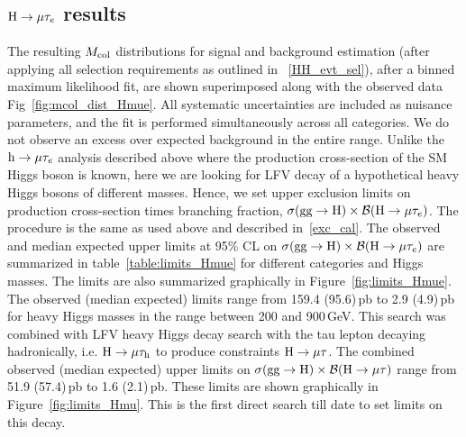 \subsection{$\text{H} \to \mu \tau_{e}$ results}
The resulting $M_{\text{col}}$ distributions for signal and background estimation (after applying all selection requirements as outlined in ~\ref{HH_evt_sel}), after a binned maximum likelihood fit, are shown superimposed along with the observed data Fig~\ref{fig:mcol_dist_Hmue}. All systematic uncertainties are included as nuisance parameters, and the fit is performed simultaneously across all categories. We do not observe an excess over expected background in the entire range. Unlike the $\text{h} \to \mu \tau_{e}$ analysis described above where the production cross-section of the SM Higgs boson is known, here we are looking for LFV decay of a hypothetical heavy Higgs bosons of different masses. Hence, we set upper exclusion limits on production cross-section times branching fraction, $\sigma(\textrm{gg}\rightarrow \text{H})\times\mathcal{B}(\text{H} \to \mu \tau_{e})$. The procedure is the same as used above and described in~\ref{exc_cal}. The observed and median expected upper limits at 95\% CL on $\sigma(\textrm{gg}\rightarrow \text{H})\times\mathcal{B}(\text{H} \to \mu \tau_{e})$ are summarized in table~\ref{table:limits_Hmue} for different categories and Higgs masses. The limits are also summarized graphically in Figure~\ref{fig:limits_Hmue}. The observed (median expected) limits range from 159.4 (95.6)\,pb to 2.9 (4.9)\,pb for heavy Higgs masses in the range between 200 and 900\,GeV. This search was combined with LFV heavy Higgs decay search with the tau lepton decaying hadronically, i.e. $\text{H} \to \mu \tau_{\text{h}}$ to produce constraints $\text{H} \to \mu \tau$. The combined observed (median expected) upper limits on $\sigma(\textrm{gg}\rightarrow \text{H})\times\mathcal{B}(\text{H} \to \mu \tau)$ range from 51.9 (57.4)\,pb to 1.6 (2.1)\,pb. These limits are shown graphically in Figure~\ref{fig:limits_Hmu}. This is the first direct search till date to set limits on this decay.      

